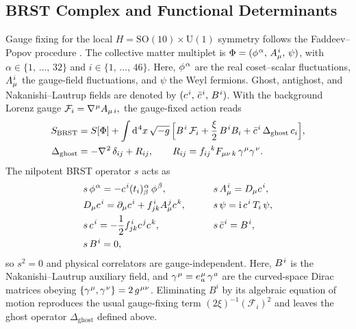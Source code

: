 \documentclass[pdflatex,sn-mathphys-num]{sn-jnl}
\theoremstyle{thmstyleone}
\theoremstyle{thmstyletwo}%
\theoremstyle{thmstylethree}%
\newcommand{\SO}[1]{\mathrm{SO(#1)}}
\newcommand{\U}[1]{\mathrm{U(#1)}}
\newcommand{\SOTen}{\SO{10}}
\newcommand{\UOne}{\U{1}}
\newcommand{\SOTenXUOne}{\SOTen \times \UOne}
\newcommand{\sm}{\hspace{.065em}}
\newcommand{\smexp}[1]{^{\sm #1}}
\newcommand{\dv}[1]{\mathrm{d}\smexp{#1}}
\begin{document}
\begin{appendices}
\subsection{BRST Complex and Functional Determinants}
\label{app:Gravity:BRST}

Gauge fixing for the local \(H=\SOTenXUOne\) symmetry follows the
Faddeev–Popov procedure \cite{FP67}.  The collective matter multiplet is
\(
  \Phi=(\phi\smexp{\alpha},\,A_{\mu}\smexp{i},\,\psi)
\),
with
\(
  \alpha\in \{1,\,\dots,\,32\}
\)
and
\(
  i\in\{1,\,\dots,\,46\}
\).
Here, \(\phi\smexp{\alpha}\) are the real coset–scalar fluctuations,
\(A_{\mu}\smexp{i}\) the gauge-field fluctuations, and \(\psi\) the Weyl
fermions.  Ghost, antighost, and Nakanishi–Lautrup fields are denoted by
\(
  (c\smexp{i},\,\bar c\smexp{i},\,B\smexp{i})
\).
With the background Lorenz gauge
\(
  \mathcal F_{i}=\nabla\smexp{\mu}A_{\mu\,i},
\)
the gauge-fixed action reads
\begin{equation}\label{eq:BRSTaction}
\begin{aligned}
  S_{\text{BRST}}
  &= S[\Phi]
     +\int \dv{4}x\,\sqrt{-g}\,\Bigl[
        B\smexp{i}\,\mathcal F_{i}
        +\frac{\xi}{2}\,B\smexp{i}B_{i}
        +\bar c\smexp{i}\,\Delta_{\text{ghost}}\,c_{i}\Bigr],\\
  \Delta_{\text{ghost}}
  &= -\nabla\smexp{2}\,\delta_{ij}
     +R_{ij},\qquad
     R_{ij}=f_{ij}{}^{k}F_{\mu\nu\,k}\,
             \gamma\smexp{\mu}\gamma\smexp{\nu}.
\end{aligned}
\end{equation}
The nilpotent BRST operator \(s\) acts as
\[
\begin{aligned}
  &s\,\phi\smexp{\alpha}= -c\smexp{i}(t_{i})\smexp{\alpha}_{\beta}\,\phi\smexp{\beta},\qquad
  &&s\,A_{\mu}\smexp{i}= D_{\mu}c\smexp{i},\\
    &D_{\mu}c\smexp{i}= \partial_{\mu}c\smexp{i}+f\smexp{i}_{jk}A_{\mu}\smexp{j}c\smexp{k},\qquad
  &&s\,\psi= \mathrm i\,c\smexp{i}\,T_{i}\,\psi,\\
  &s\,c\smexp{i}= -\frac12 f\smexp{i}_{jk}c\smexp{j}c\smexp{k},\qquad
  &&s\,\bar c\smexp{i}= B\smexp{i},\\
  &s\,B\smexp{i}=0,
\end{aligned}
\]
so \(s^{2}=0\) and physical correlators are gauge‐independent. Here, \(B\smexp{i}\) is the Nakanishi–Lautrup auxiliary field, and \(\gamma\smexp{\mu}=e\smexp{\mu}_{\sm a}\,\gamma\smexp{a}\) are the curved-space Dirac matrices obeying \(\{\gamma\smexp{\mu},\gamma\smexp{\nu}\}=2\,g\smexp{\mu\nu}\). Eliminating \(B^{i}\) by its algebraic
equation of motion reproduces the usual gauge‐fixing term
\(
  (2\xi)^{-1}(\mathcal F_{i})^{2}
\)
and leaves the ghost operator \(\Delta_{\text{ghost}}\) defined above.



\end{appendices}
\end{document}
